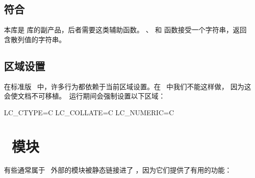 \subsection{符合 }

本库是  库的副产品，后者需要这类辅助函数。
、 和
 函数接受一个字符串，返回含散列值的字符串。

\subsection{区域设置}


在标准版 \LUA\ 中，许多行为都依赖于当前区域设置。在 \LUATEX\ 中我们不能这样做，
因为这会使文档不可移植。\LUATEX\ 运行期间会强制设置以下区域：

\begin{typing}
LC_CTYPE=C
LC_COLLATE=C
LC_NUMERIC=C
\end{typing}

\section{\LUA\ 模块}


有些通常属于 \LUA\ 外部的模块被静态链接进了 \LUATEX，因为它们提供了有用的功能：

